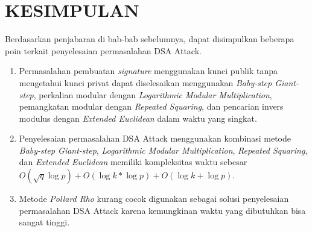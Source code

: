 \chapter{KESIMPULAN}

Berdasarkan penjabaran di bab-bab sebelumnya, dapat disimpulkan beberapa poin terkait penyelesaian permasalahan DSA Attack.
\begin{enumerate}
\item Permasalahan pembuatan \textit{signature} menggunakan kunci publik tanpa mengetahui kunci privat dapat diselesaikan menggunakan \textit{Baby-step Giant-step}, perkalian modular dengan \textit{Logarithmic Modular Multiplication}, pemangkatan modular dengan \textit{Repeated Squaring}, dan pencarian invers modulus dengan \textit{Extended Euclidean} dalam waktu yang singkat.
\item Penyelesaian permasalahan DSA Attack menggunakan kombinasi metode \textit{Baby-step Giant-step}, \textit{Logarithmic Modular Multiplication}, \textit{Repeated Squaring}, dan \textit{Extended Euclidean} memiliki kompleksitas waktu sebesar $ O(\sqrt{q} \log p) + O (\log k * \log p) + O(\log k + \log p) $.
\item Metode \textit{Pollard Rho} kurang cocok digunakan sebagai solusi penyelesaian permasalahan DSA Attack karena kemungkinan waktu yang dibutuhkan bisa sangat tinggi.
\end{enumerate}